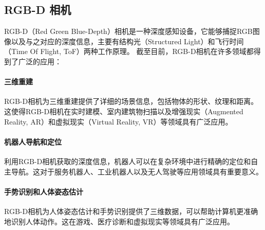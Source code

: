 \subsection{RGB-D 相机}

\par RGB-D（Red Green Blue-Depth）相机是一种深度感知设备，它能够捕捉RGB图像以及与之对应的深度信息，主要有结构光（Structured
Light）\cite{structuredlight}和飞行时间（Time Of Flight, ToF）\cite{timeoflight}两种工作原理。
截至目前，RGB-D相机在许多领域都得到了广泛的应用：

\paragraph{三维重建}
\par RGB-D相机为三维重建提供了详细的场景信息，包括物体的形状、纹理和距离。这使得RGB-D相机在实时建模、室内建筑物扫描以及增强现实（Augmented
Reality, AR）和虚拟现实（Virtual Reality, VR）等领域具有广泛应用\cite{kim2016real,endres20133}。

\paragraph{机器人导航和定位}
\par 利用RGB-D相机获取的深度信息，机器人可以在复杂环境中进行精确的定位和自主导航。这对于服务机器人、工业机器人以及无人驾驶等应用领域具有重要意义\cite{taketomi2017visual,EfficientRGB-DSLAM}。

\paragraph{手势识别和人体姿态估计}
\par RGB-D相机为人体姿态估计和手势识别提供了三维数据，可以帮助计算机更准确地识别人体动作。这在游戏、医疗诊断和虚拟现实等领域具有广泛应用\cite{kim2016real,supancic2015depth,ge2018real}。


